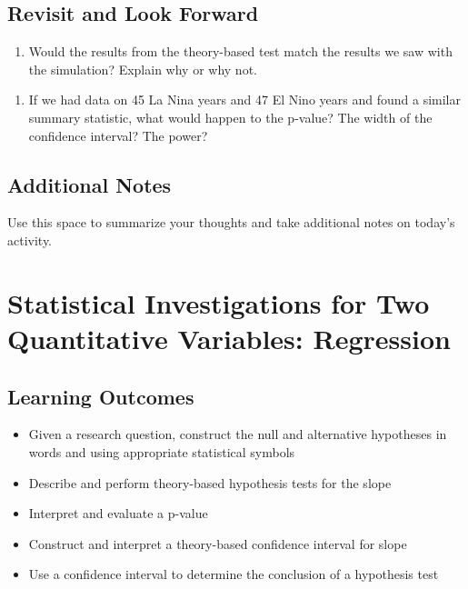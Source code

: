 \documentclass[
]{report}
\providecommand{\tightlist}{%
  \setlength{\itemsep}{0pt}\setlength{\parskip}{0pt}}
\begin{document}
\vspace{3in}

\hypertarget{revisit-and-look-forward-2}{%
\section{Revisit and Look Forward}\label{revisit-and-look-forward-2}}

\begin{enumerate}
\def\labelenumi{\arabic{enumi}.}
\setcounter{enumi}{19}
\tightlist
\item
  Would the results from the theory-based test match the results we saw with the simulation? Explain why or why not.
\end{enumerate}

\vspace{1in}

\begin{enumerate}
\def\labelenumi{\arabic{enumi}.}
\setcounter{enumi}{20}
\tightlist
\item
  If we had data on 45 La Nina years and 47 El Nino years and found a similar summary statistic, what would happen to the p-value? The width of the confidence interval? The power?
\end{enumerate}

\vspace{1in}

\hypertarget{additional-notes-8}{%
\section{Additional Notes}\label{additional-notes-8}}

Use this space to summarize your thoughts and take additional notes on today's activity.

\hypertarget{statistical-investigations-for-two-quantitative-variables-regression}{%
\chapter{Statistical Investigations for Two Quantitative Variables: Regression}\label{statistical-investigations-for-two-quantitative-variables-regression}}

\hypertarget{learning-outcomes-4}{%
\section{Learning Outcomes}\label{learning-outcomes-4}}

\begin{itemize}
\item
  Given a research question, construct the null and alternative hypotheses
  in words and using appropriate statistical symbols
\item
  Describe and perform theory-based hypothesis tests for the slope
\item
  Interpret and evaluate a p-value
\item
  Construct and interpret a theory-based confidence interval for slope
\item
  Use a confidence interval to determine the conclusion of a hypothesis test
\end{itemize}
\end{document}
